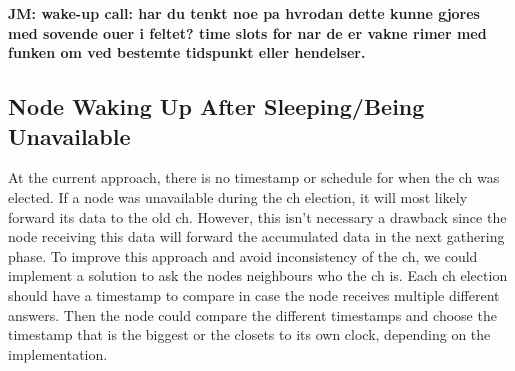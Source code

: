 \documentclass[USenglish]{uit-thesis}
\begin{document}
\textbf{JM: wake-up call: har du tenkt noe pa hvrodan dette kunne gjores med sovende ouer i feltet? time slots for nar de er vakne rimer med funken om  ved bestemte tidspunkt eller hendelser.}


\subsection{Node Waking Up After Sleeping/Being Unavailable}




At the current approach, there is no timestamp or schedule for when the \gls{ch} was elected. If a node was unavailable during the \gls{ch} election, it will most likely forward its data to the old \gls{ch}. However, this isn't necessary a drawback since the node receiving this data will forward the accumulated data in the next gathering phase.
To improve this approach and avoid inconsistency of the \gls{ch}, we could implement a solution to ask the nodes neighbours who the \gls{ch} is. Each \gls{ch} election should have a timestamp to compare in case the node receives multiple different answers. Then the node could compare the different timestamps and choose the timestamp that is the biggest or the closets to its own clock, depending on the implementation. 

\end{document}
